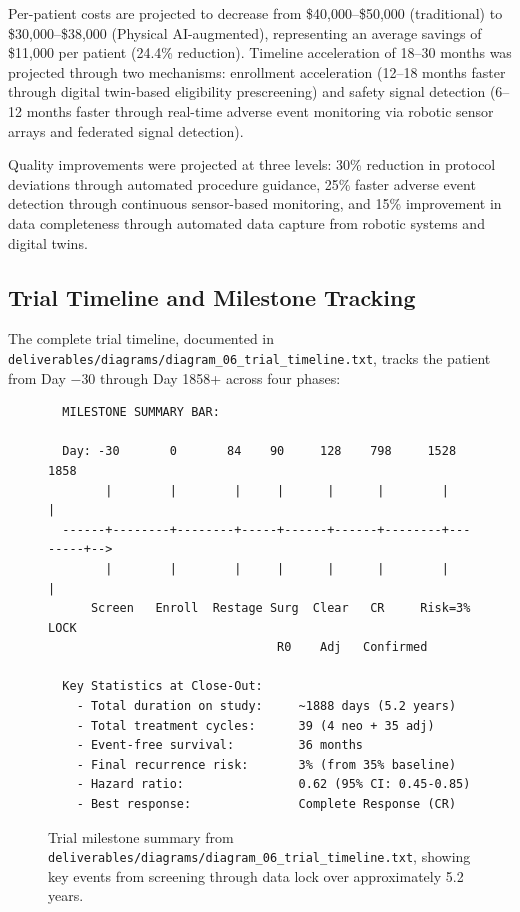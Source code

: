 \documentclass{article}
\begin{document}
Per-patient costs are projected to decrease from \$40,000--\$50,000 (traditional) to \$30,000--\$38,000 (Physical AI-augmented), representing an average savings of \$11,000 per patient (24.4\% reduction). Timeline acceleration of 18--30 months was projected through two mechanisms: enrollment acceleration (12--18 months faster through digital twin-based eligibility prescreening) and safety signal detection (6--12 months faster through real-time adverse event monitoring via robotic sensor arrays and federated signal detection).

Quality improvements were projected at three levels: 30\% reduction in protocol deviations through automated procedure guidance, 25\% faster adverse event detection through continuous sensor-based monitoring, and 15\% improvement in data completeness through automated data capture from robotic systems and digital twins.

\subsection{Trial Timeline and Milestone Tracking}

The complete trial timeline, documented in \texttt{deliverables/diagrams/diagram\_06\_trial\_timeline.txt}, tracks the patient from Day $-$30 through Day 1858+ across four phases:

\begin{figure}[H]
\begin{verbatim}
  MILESTONE SUMMARY BAR:

  Day: -30       0       84    90     128    798     1528     1858
        |        |        |     |      |      |        |        |
  ------+--------+--------+-----+------+------+--------+--------+-->
        |        |        |     |      |      |        |        |
      Screen   Enroll  Restage Surg  Clear   CR     Risk=3%   LOCK
                                R0    Adj   Confirmed

  Key Statistics at Close-Out:
    - Total duration on study:     ~1888 days (5.2 years)
    - Total treatment cycles:      39 (4 neo + 35 adj)
    - Event-free survival:         36 months
    - Final recurrence risk:       3% (from 35% baseline)
    - Hazard ratio:                0.62 (95% CI: 0.45-0.85)
    - Best response:               Complete Response (CR)
\end{verbatim}
\caption{Trial milestone summary from \texttt{deliverables/diagrams/diagram\_06\_trial\_timeline.txt}, showing key events from screening through data lock over approximately 5.2 years.}
\label{fig:trial-timeline}
\end{figure}
\end{document}
